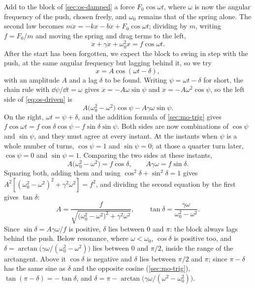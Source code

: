 Add to the block of \cref{sec:os-damped} a force $F_0\cos\omega t$, where
$\omega$ is now the angular frequency of the push, chosen freely, and
$\omega_0$ remains that of the spring alone. The second law becomes
$m\ddot{x} = -kx - b\dot{x} + F_0\cos\omega t$; dividing by $m$, writing
$f = F_0/m$ and moving the spring and drag terms to the left,
\begin{equation}
   \ddot{x} + \gamma\dot{x} + \omega_0^2 x = f\cos\omega t .
   \label{eq:os-driven}
\end{equation}
After the start has been forgotten, we expect the block to swing in step
with the push, at the same angular frequency but lagging behind it, so we
try
\begin{equation*}
   x = A\cos(\omega t - \delta) ,
\end{equation*}
with an amplitude $A$ and a lag $\delta$ to be found. Writing $\psi =
\omega t - \delta$ for short, the chain rule with $\dd\psi/\dd t = \omega$
gives $\dot{x} = -A\omega\sin\psi$ and $\ddot{x} = -A\omega^2\cos\psi$,
so the left side of \cref{eq:os-driven} is
\begin{equation*}
   A\bigl(\omega_0^2 - \omega^2\bigr)\cos\psi - A\gamma\omega\sin\psi .
\end{equation*}
On the right, $\omega t = \psi + \delta$, and the addition formula of
\cref{sec:mo-trig} gives $f\cos\omega t = f\cos\delta\cos\psi - f\sin
\delta\sin\psi$. Both sides are now combinations of $\cos\psi$ and $\sin
\psi$, and they must agree at every instant. At the instants when $\psi$
is a whole number of turns, $\cos\psi = 1$ and $\sin\psi = 0$; at those a
quarter turn later, $\cos\psi = 0$ and $\sin\psi = 1$. Comparing the two
sides at these instants,
\begin{equation*}
   A\bigl(\omega_0^2 - \omega^2\bigr) = f\cos\delta , \qquad
   A\gamma\omega = f\sin\delta .
\end{equation*}
Squaring both, adding them and using $\cos^2\delta + \sin^2\delta = 1$
gives $A^2[(\omega_0^2 - \omega^2)^2 + \gamma^2\omega^2] = f^2$, and
dividing the second equation by the first gives $\tan\delta$:
\begin{equation}
   A = \frac{f}{\sqrt{\bigl(\omega_0^2 - \omega^2\bigr)^2 + \gamma^2\omega^2}} ,
   \qquad
   \tan\delta = \frac{\gamma\omega}{\omega_0^2 - \omega^2} .
   \label{eq:os-resonance}
\end{equation}
Since $\sin\delta = A\gamma\omega/f$ is positive, $\delta$ lies between 0
and $\pi$: the block always lags behind the push. Below resonance, where
$\omega < \omega_0$, $\cos\delta$ is positive too, and $\delta =
\arctan\bigl(\gamma\omega/(\omega_0^2 - \omega^2)\bigr)$ lies between 0
and $\pi/2$, inside the range of the arctangent. Above it $\cos\delta$ is
negative and $\delta$ lies between $\pi/2$ and $\pi$; since $\pi -
\delta$ has the same sine as $\delta$ and the opposite cosine
(\cref{sec:mo-trig}), $\tan(\pi - \delta) = -\tan\delta$, and $\delta =
\pi - \arctan\bigl(\gamma\omega/(\omega^2 - \omega_0^2)\bigr)$.

